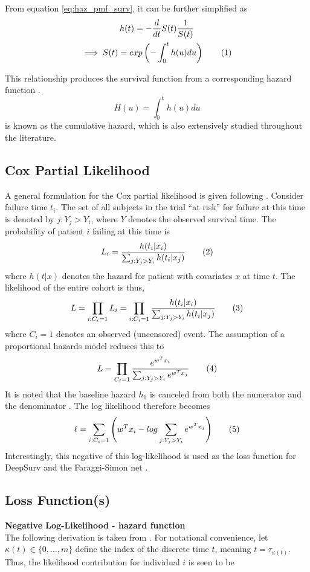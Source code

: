 \documentclass[%
 twocolumn,
 reprint,
 amsmath,amssymb,
 aps,nofootinbib
]{revtex4-2}
\newcommand\numberthis{\addtocounter{equation}{1}\tag{\theequation}} %
\begin{document}
From equation \ref{eq:haz_pmf_surv}, it can be further simplified as
\begin{gather*}
h(t) = -\frac{d}{dt}S(t)\frac{1}{S(t)}\\
\implies S(t) = exp\left (- \int_{0}^{t}h(u)du\right) \numberthis  \label{eq:cum_haz}
\end{gather*}

This relationship produces the survival function from a corresponding hazard function \cite{Moore_2016}.
\[
H(u) = \int_{0}^{t}h(u)du
\]
is known as the cumulative hazard, which is also extensively studied throughout the literature.

\subsection{\label{app:part_lik}Cox Partial Likelihood}
A general formulation for the Cox partial likelihood is given following \cite{Moore_2016}. Consider failure time $t_i$. The set of all subjects in the trial “at risk” for failure at this time is denoted by $j:Y_j>Y_i$, where $Y$ denotes the observed survival time. The probability of patient $i$ failing at this time is 
\[
L_i = \frac{h(t_i | x_i)}{\sum^{}_{j:Y_j>Y_i}h(t_i|x_j)} \numberthis  \label{eq:likelihood_contribution}
\]
where $h(t|x)$ denotes the hazard for patient with covariates $x$ at time $t$. The likelihood of the entire cohort is thus,
\[
L = \prod^{}_{i:C_i=1}L_i = \prod^{}_{i:C_i=1}\frac{h(t_i | x_i)}{\sum^{}_{j:Y_j>Y_i}h(t_i|x_j)} \numberthis  \label{eq:likelihood}
\]
where $C_i=1$ denotes an observed (uncensored) event. The assumption of a proportional hazards model reduces this to
\[
L = \prod^{}_{C_i=1}\frac{e^{w^Tx_i}}{\sum^{}_{j:Y_j>Y_i}e^{w^Tx_j}} \numberthis  \label{eq:reduced_likelihood_contribution}
\] 
It is noted that the baseline hazard $h_0$ is canceled from both the numerator and the denominator \cite{raykar_cindex}. The log likelihood therefore becomes
\[
\ell = \sum^{}_{i:C_i=1} \Bigg( w^Tx_i - log\sum^{}_{j:Y_j>Y_i}e^{w^Tx_j}\Bigg) \numberthis  \label{eq:log_likelihood}
\]
Interestingly, this negative of this log-likelihood is used as the loss function for DeepSurv \cite{deepsurv} and the Faraggi-Simon net \cite{faraggi_simons}.\\

\subsection{\label{app:loss}Loss Function(s)}
\textbf{Negative Log-Likelihood - hazard function}\\
The following derivation is taken from \cite{kvamme_continuous_2019}. For notational convenience, let $\kappa(t) \in \{0, \ldots , m\}$ define the index of the discrete time $t$, meaning $t = \tau_{\kappa(t)}$. Thus, the likelihood contribution for individual $i$ is seen to be 
\end{document}
